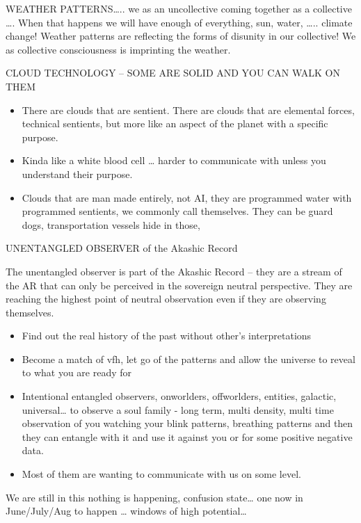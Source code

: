 WEATHER PATTERNS\ldots{}.. we as an uncollective coming together as a
collective \ldots{}. When that happens we will have enough of
everything, sun, water, \ldots{}.. climate change! Weather patterns are
reflecting the forms of disunity in our collective! We as collective
consciousness is imprinting the weather.

CLOUD TECHNOLOGY -- SOME ARE SOLID AND YOU CAN WALK ON THEM

\begin{itemize}
\item
  There are clouds that are sentient. There are clouds that are
  elemental forces, technical sentients, but more like an aspect of the
  planet with a specific purpose.
\item
  Kinda like a white blood cell \ldots{} harder to communicate with
  unless you understand their purpose.
\item
  Clouds that are man made entirely, not AI, they are programmed water
  with programmed sentients, we commonly call themselves. They can be
  guard dogs, transportation vessels hide in those,
\end{itemize}

UNENTANGLED OBSERVER of the Akashic Record

The unentangled observer is part of the Akashic Record -- they are a
stream of the AR that can only be perceived in the sovereign neutral
perspective. They are reaching the highest point of neutral observation
even if they are observing themselves.

\begin{itemize}
\item
  Find out the real history of the past without other's interpretations
\item
  Become a match of vfh, let go of the patterns and allow the universe
  to reveal to what you are ready for
\item
  Intentional entangled observers, onworlders, offworlders, entities,
  galactic, universal\ldots{} to observe a soul family - long term,
  multi density, multi time observation of you watching your blink
  patterns, breathing patterns and then they can entangle with it and
  use it against you or for some positive negative data.
\item
  Most of them are wanting to communicate with us on some level.
\end{itemize}

We are still in this nothing is happening, confusion state\ldots{} one
now in June/July/Aug to happen \ldots{} windows of high
potential\ldots{}

